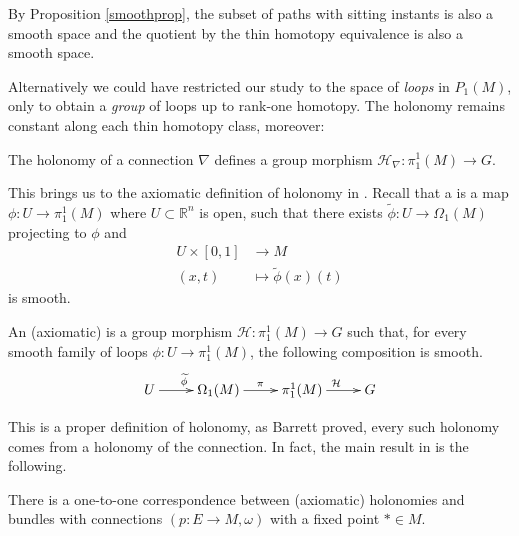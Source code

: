 By Proposition \ref{smoothprop}, the subset of paths with sitting instants is also a smooth space and the quotient by the thin homotopy equivalence is also a smooth space. 

Alternatively we could have restricted our study to the space  of \emph{loops} in $P_1(M)$, only to obtain a \emph{group}  of loops up to rank-one homotopy. 
The holonomy remains constant along each thin homotopy class, moreover:
\begin{prop}
 The holonomy of a connection $\nabla$ defines a group morphism $\mathcal{H}_\nabla:\pi_1^1(M)\rightarrow G$.
\end{prop}
This brings us to the axiomatic definition of holonomy in \cite{barrett,picken_holonomy}. Recall that a  is a map $\phi:U\rightarrow \pi_1^1(M)$ where $U\subset \mathbb{R}^n$ is open, such that there exists $\widetilde{\phi}:U\rightarrow \Omega_1(M)$ projecting to $\phi$ and
\begin{align*}
 U\times [0,1] &\rightarrow M \\
  (x,t)&\mapsto \widetilde{\phi}(x)(t)
\end{align*}
is smooth.
\begin{definition}
 An (axiomatic)  is a group morphism $\mathcal{H}:\pi_1^1(M) \rightarrow G$ such that, for every smooth family of loops $\phi:U\rightarrow \pi_1^1(M)$, the following composition is smooth.
\[
 \xymatrix{U\ar[r]^{\widetilde{\phi}} & \Omega_1(M) \ar[r]^\pi & \pi_1^1(M)\ar[r]^{\mathcal{H}} & G}
\]
\end{definition}
This is a proper definition of holonomy, as Barrett proved, every such holonomy comes from a holonomy of the connection. In fact, the main result in \cite{picken_holonomy} is the following.

\begin{theorem}\label{bundle121}
 There is a one-to-one correspondence between (axiomatic) holonomies and bundles with connections $(p:E\rightarrow M,\omega)$ with a fixed point $*\in M$.
\end{theorem}

\newpage
